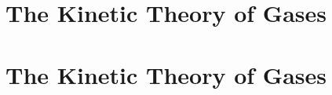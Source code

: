\def\chapterbody{
  \section{The Kinetic Theory of Gases}

  
}

\ifx\bookmode\undefined
  

  \setcounter{section}{38}

  
    \chapterbody
  
\else
  \chapterbody
\fi
